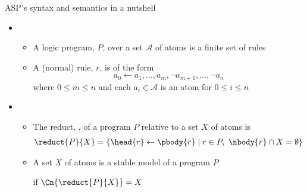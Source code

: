\begin{frame}{ASP's syntax and semantics in a nutshell}
  \medskip
  \begin{itemize}
  \item<1-> 
    \begin{itemize}
    \item
      A \alert{logic program}, $P$, over a set $\mathcal{A}$ of atoms is a finite \alert{set} of rules
      \smallskip
    \item
      A (normal) \alert{rule}, $r$, is of the form
      \[
        a_0 \leftarrow a_1,\dots,a_m, \neg a_{m+1}, \dots, \neg a_n
      \]
      where $0\leq m\leq n$ and each $a_i\in{\mathcal{A}}$ is an \alert{atom} for $0\leq i\leq n$
    \end{itemize}
    \medskip
  \item<2-> 
    \begin{itemize}
    \item The \alert{reduct}, , of a program $P$ relative to
      a set $X$ of atoms is
      \begin{align*}
        \reduct{P}{X} &= \{\head{r}\leftarrow\pbody{r} \mid r\in P,\ \nbody{r}\cap X=\emptyset\}
      \end{align*}
    \item A set $X$ of atoms is a \alert{stable model} of a program $P$

      if $\Cn{\reduct{P}{X}}=X$
    \end{itemize}
  \end{itemize}
\end{frame}
%
